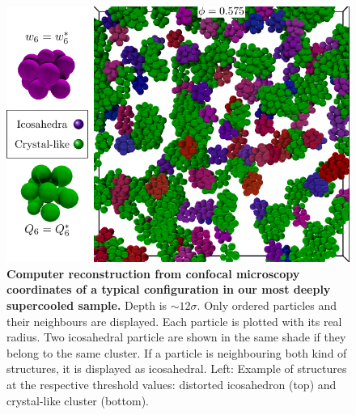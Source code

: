\begin{figure}
\begin{center}
\includegraphics{generate_figures-figure3.pdf}
\end{center}
\caption{\textbf{Computer reconstruction from confocal microscopy coordinates of a typical configuration in our most deeply supercooled sample.} Depth is $\sim 12\sigma$. Only ordered particles and their neighbours are displayed. Each particle is plotted with its real radius. Two icosahedral particle are shown in the same shade if they belong to the same cluster. If a particle is neighbouring both kind of structures, it is displayed as icosahedral. Left: Example of structures at the respective threshold values: distorted icosahedron (top) and crystal-like cluster (bottom).}
	\label{fig:3D}
\end{figure}

